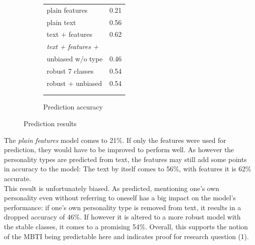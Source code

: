 \begin{figure}[b]
\begin{subfigure}[b]{.35\textwidth}
\begin{tabular}{ll}
            plain features & 0.21 \\
            plain text & 0.56 \\
            text + features & 0.62 \\
            \noalign{\smallskip}\hline\noalign{\smallskip}
            \textit{text + features +} & \\
            unbiased w/o type & 0.46 \\
            robust 7 classes & 0.54 \\
            robust + unbiased & 0.54 \\
            \noalign{\smallskip}\hline
            \\ \\
        \end{tabular}
        \caption{Prediction accuracy}
    \end{subfigure}
    \caption{Prediction results}
    \label{fig:Pred}
\end{figure}
The \textit{plain features} model comes to 21\%. If only the features were used for prediction, they would have to be improved to perform well. As however the personality types are predicted from text, the features may still add some points in accuracy to the model: The text by itself comes to 56\%, with features it is 62\% accurate.\\
This result is unfortunately biased. As predicted, mentioning one's own personality even without referring to oneself has a big impact on the model's performance: if one's own personality type is removed from text, it results in a dropped accuracy of 46\%. If however it is altered to a more robust model with the stable classes, it comes to a promising 54\%. Overall, this supports the notion of the MBTI being predictable here and indicates proof for research question (1).